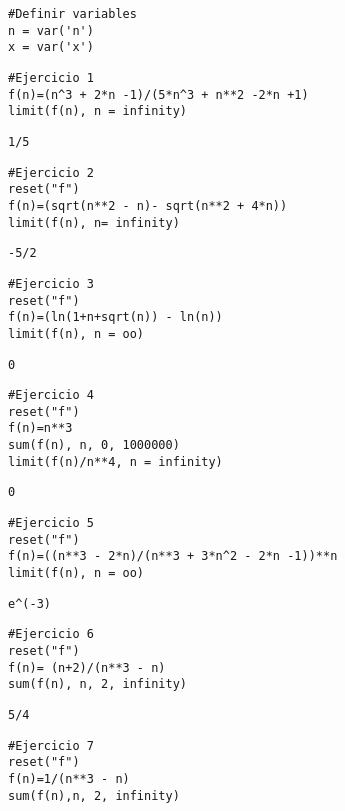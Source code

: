 \documentclass[
]{article}
\author{}
\date{}
\begin{document}
\begin{verbatim}
#Definir variables
n = var('n')
x = var('x')
\end{verbatim}

\begin{verbatim}
#Ejercicio 1
f(n)=(n^3 + 2*n -1)/(5*n^3 + n**2 -2*n +1)
limit(f(n), n = infinity)
\end{verbatim}

\begin{verbatim}
1/5
\end{verbatim}

\begin{verbatim}
#Ejercicio 2
reset("f")
f(n)=(sqrt(n**2 - n)- sqrt(n**2 + 4*n))
limit(f(n), n= infinity)
\end{verbatim}

\begin{verbatim}
-5/2
\end{verbatim}

\begin{verbatim}
#Ejercicio 3
reset("f")
f(n)=(ln(1+n+sqrt(n)) - ln(n))
limit(f(n), n = oo)
\end{verbatim}

\begin{verbatim}
0
\end{verbatim}

\begin{verbatim}
#Ejercicio 4
reset("f")
f(n)=n**3
sum(f(n), n, 0, 1000000)
limit(f(n)/n**4, n = infinity)
\end{verbatim}

\begin{verbatim}
0
\end{verbatim}

\begin{verbatim}
#Ejercicio 5
reset("f")
f(n)=((n**3 - 2*n)/(n**3 + 3*n^2 - 2*n -1))**n
limit(f(n), n = oo)
\end{verbatim}

\begin{verbatim}
e^(-3)
\end{verbatim}

\begin{verbatim}
#Ejercicio 6
reset("f")
f(n)= (n+2)/(n**3 - n)
sum(f(n), n, 2, infinity)
\end{verbatim}

\begin{verbatim}
5/4
\end{verbatim}

\begin{verbatim}
#Ejercicio 7 
reset("f")
f(n)=1/(n**3 - n)
sum(f(n),n, 2, infinity)
\end{verbatim}
\end{document}
